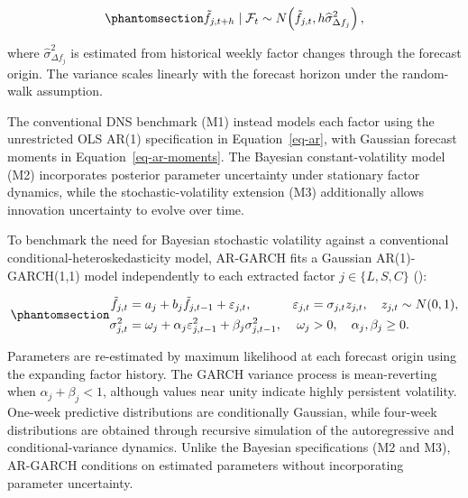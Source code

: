 \documentclass[
  12pt,
  letterpaper,
  DIV=11,
  numbers=noendperiod]{scrreprt}
\begin{document}
\begin{equation}\protect\phantomsection\label{eq-factor-rw}{
\tilde f_{j,t+h}\mid\mathcal F_t
\sim N\!\left(
\tilde f_{j,t},
h\widehat{\sigma}_{\Delta f_j}^{2}
\right),
}\end{equation}

where \(\widehat{\sigma}_{\Delta f_j}^{2}\) is estimated from historical
weekly factor changes through the forecast origin. The variance scales
linearly with the forecast horizon under the random-walk assumption.

The conventional DNS benchmark (M1) instead models each factor using the
unrestricted OLS AR(1) specification in Equation~\ref{eq-ar}, with
Gaussian forecast moments in Equation~\ref{eq-ar-moments}. The Bayesian
constant-volatility model (M2) incorporates posterior parameter
uncertainty under stationary factor dynamics, while the
stochastic-volatility extension (M3) additionally allows innovation
uncertainty to evolve over time.

To benchmark the need for Bayesian stochastic volatility against a
conventional conditional-heteroskedasticity model, AR-GARCH fits a
Gaussian AR(1)-GARCH(1,1) model independently to each extracted factor
\(j\in\{L,S,C\}\) ():

\begin{equation}\protect\phantomsection\label{eq-ar-garch}{
\begin{aligned}
\tilde f_{j,t}&=a_j+b_j\tilde f_{j,t-1}+\varepsilon_{j,t},
&\varepsilon_{j,t}&=\sigma_{j,t}z_{j,t},\quad z_{j,t}\sim N(0,1),\\
\sigma_{j,t}^{2}&=\omega_j+\alpha_j\varepsilon_{j,t-1}^{2}
+\beta_j\sigma_{j,t-1}^{2},
&\omega_j&>0,\quad\alpha_j,\beta_j\geq0.
\end{aligned}
}\end{equation}

Parameters are re-estimated by maximum likelihood at each forecast
origin using the expanding factor history. The GARCH variance process is
mean-reverting when \(\alpha_j+\beta_j<1\), although values near unity
indicate highly persistent volatility. One-week predictive distributions
are conditionally Gaussian, while four-week distributions are obtained
through recursive simulation of the autoregressive and
conditional-variance dynamics. Unlike the Bayesian specifications (M2
and M3), AR-GARCH conditions on estimated parameters without
incorporating parameter uncertainty.
\end{document}
